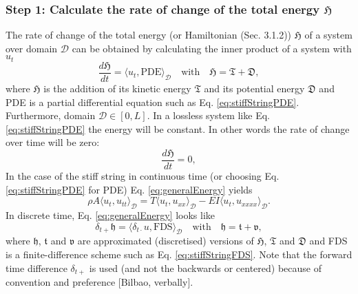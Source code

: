 \documentclass{article}
\begin{document}
\subsubsection*{Step 1: Calculate the rate of change of the total energy $\mathfrak{H}$} %
The rate of change of the total energy (or Hamiltonian (Sec. 3.1.2)) $\mathfrak{H}$ of a system over domain $\mathcal{D}$ can be obtained by calculating the inner product of a system with $u_t$ \cite{Desv2017} %
\begin{equation}\label{eq:generalEnergy}
    \frac{d \mathfrak{H}}{dt} = \langle u_t, \text{PDE} \rangle_\mathcal{D} \quad \text{with} \quad \mathfrak{H} = \mathfrak{T} + \mathfrak{D},
\end{equation}
where $\mathfrak{H}$ is the addition of its kinetic energy $\mathfrak{T}$ and its potential energy $\mathfrak{D}$ and PDE is a partial differential equation such as Eq. \eqref{eq:stiffStringPDE}. Furthermore, domain $\mathcal{D} \in [0,L]$. In a lossless system like Eq. \eqref{eq:stiffStringPDE} the energy will be constant. In other words the rate of change over time will be zero:
\begin{equation}\label{eq:energyZero}
    \frac{d \mathfrak{H}}{dt} = 0,
\end{equation}
In the case of the stiff string in continuous time (or choosing Eq. \eqref{eq:stiffStringPDE} for PDE) Eq. \eqref{eq:generalEnergy} yields
\begin{equation}\label{eq:stiffStringInnerProduct}
     \rho A \langle u_t, u_{tt}\rangle_\mathcal{D} = T \langle u_t, u_{xx}\rangle_\mathcal{D} - EI \langle u_t, u_{xxxx} \rangle_\mathcal{D}.
\end{equation}
In discrete time, Eq. \eqref{eq:generalEnergy} looks like %
\begin{equation}\label{eq:generalEnergyDiscretised}
    \delta_{t+}\mathfrak{h} = \langle \delta_{t\cdot}u, \text{FDS}\rangle_\mathcal{D} \quad \text{with} \quad \mathfrak{h} = \mathfrak{t} + \mathfrak{v},
\end{equation}
where $\mathfrak{h}$, $\mathfrak{t}$ and $\mathfrak{v}$ are approximated (discretised) versions of $\mathfrak{H}$, $\mathfrak{T}$ and $\mathfrak{D}$ and FDS is a finite-difference scheme such as Eq. \eqref{eq:stiffStringFDS}. Note that the forward time difference $\delta_{t+}$ is used (and not the backwards or centered) because of convention and preference [Bilbao, verbally].
\end{document}
